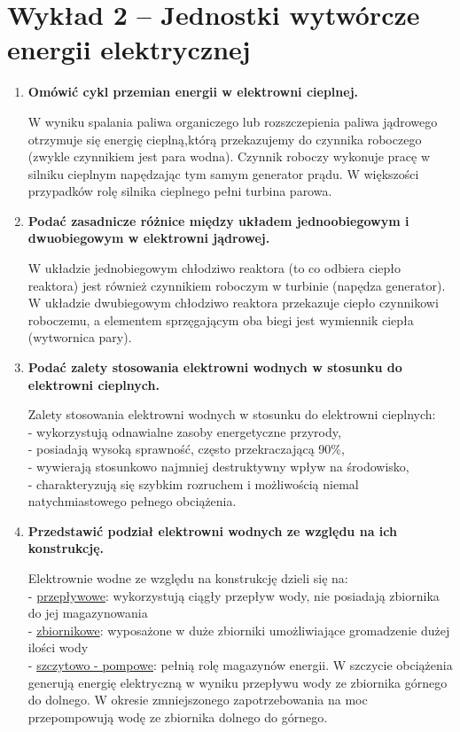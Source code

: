 \documentclass[12pt]{article}
\newcommand{\pytanie}[1]{\item \textbf{#1}}
\begin{document}
\section{Wykład 2 -- Jednostki wytwórcze energii elektrycznej}
\begin{enumerate}
	\pytanie{Omówić cykl przemian energii w elektrowni cieplnej.}
	
	    W wyniku spalania paliwa organiczego lub rozszczepienia paliwa jądrowego otrzymuje się energię cieplną,którą przekazujemy do czynnika roboczego (zwykle czynnikiem jest para wodna). Czynnik roboczy wykonuje pracę w silniku cieplnym napędzając tym samym generator prądu. W większości przypadków rolę silnika cieplnego pełni turbina parowa.
	
	\pytanie{Podać zasadnicze różnice między układem jednoobiegowym i dwuobiegowym w elektrowni jądrowej.}
	
	    W układzie jednobiegowym chłodziwo reaktora (to co odbiera ciepło reaktora) jest również czynnikiem roboczym w turbinie (napędza generator).\\
	    W układzie dwubiegowym chłodziwo reaktora przekazuje ciepło czynnikowi roboczemu, a elementem sprzęgającym oba biegi jest wymiennik ciepła (wytwornica pary).
	
	\pytanie{Podać zalety stosowania elektrowni wodnych w stosunku do elektrowni cieplnych.}
	
	    Zalety stosowania elektrowni wodnych w stosunku do elektrowni cieplnych:\\
	    - wykorzystują odnawialne zasoby energetyczne przyrody,\\
	    - posiadają wysoką sprawność, często przekraczającą 90\%,\\
	    - wywierają stosunkowo najmniej destruktywny wpływ na środowisko,\\
	    - charakteryzują się szybkim rozruchem i możliwością niemal natychmiastowego pełnego obciążenia.
	
	\pytanie{Przedstawić podział elektrowni wodnych ze względu na ich konstrukcję.}
	
	    Elektrownie wodne ze względu na konstrukcję dzieli się na:\\
	    - \underline{przepływowe}: wykorzystują ciągły przepływ wody, nie posiadają zbiornika do jej magazynowania\\
	    - \underline{zbiornikowe}: wyposażone w duże zbiorniki umożliwiające gromadzenie dużej ilości wody\\
	    - \underline{szczytowo - pompowe}: pełnią rolę magazynów energii. W szczycie obciążenia generują energię elektryczną w wyniku przepływu wody ze zbiornika górnego do dolnego. W okresie zmniejszonego zapotrzebowania na moc przepompowują wodę ze zbiornika dolnego do górnego.
	

\end{enumerate}
\end{document}
